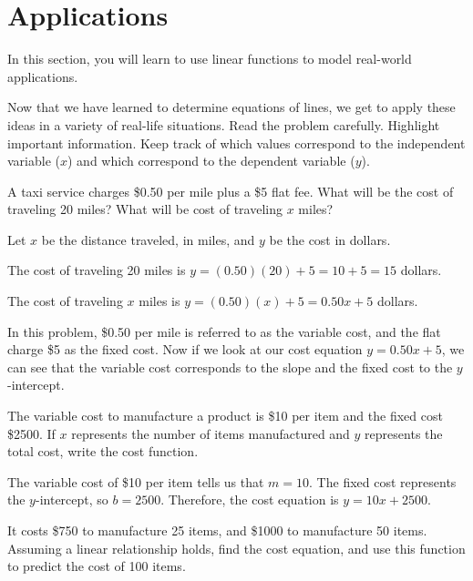 \section{Applications}
In this section, you will learn to use linear functions to model real-world applications.

Now that we have learned to determine equations of lines, we get to apply these ideas in a variety of real-life situations.
Read the problem carefully. Highlight important information.  Keep track of which values correspond to the independent variable ($x$) and which correspond to the dependent variable ($y$).

\begin{example}
    A taxi service charges \$0.50 per mile plus a \$5 flat fee.  What will be the cost of traveling 20 miles?  What will be cost of traveling $x$ miles?
\end{example}

\begin{solution}
    Let $x$ be the distance traveled, in miles, and $y$ be the cost in dollars.

    The cost of traveling 20 miles is $y = (0.50)(20) + 5 = 10 + 5 = 15$ dollars.

    The cost of traveling $x$ miles is $y = (0.50)(x) + 5 = 0.50x + 5$ dollars.

    In this problem, \$0.50 per mile is referred to as the variable cost, and the flat charge \$5 as the fixed cost.  Now if we look at our cost equation $y = 0.50x + 5$, we can see that the variable cost corresponds to the slope and the fixed cost to the $y$-intercept.
\end{solution}

\begin{example}
    The variable cost to manufacture a product is \$10 per item and the fixed cost \$2500.
    If $x$ represents the number of items manufactured and $y$ represents the total cost, write the cost function.
\end{example}

\begin{solution}
    The variable cost of \$10 per item tells us that $m = 10$.
    The fixed cost represents the $y$-intercept, so $b = 2500$.
    Therefore, the cost equation is $y = 10x + 2500$.
\end{solution}

\begin{example}
    It costs \$750 to manufacture 25 items, and \$1000 to manufacture 50 items.  Assuming a linear relationship holds, find the cost equation, and use this function to predict the cost of 100 items.
\end{example}

